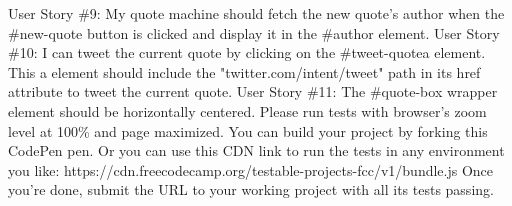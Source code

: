 \documentclass{article}%
\begin{document}
User Story \#9: My quote machine should fetch the new quote's author when the \#new{-}quote button is clicked and display it in the \#author element.\newline%
User Story \#10: I can tweet the current quote by clicking on the \#tweet{-}quotea element. This a element should include the "twitter.com/intent/tweet" path in its href attribute to tweet the current quote.\newline%
User Story \#11: The \#quote{-}box wrapper element should be horizontally centered. Please run tests with browser's zoom level at 100\% and page maximized.\newline%
You can build your project by forking this CodePen pen. Or you can use this CDN link to run the tests in any environment you like: https://cdn.freecodecamp.org/testable{-}projects{-}fcc/v1/bundle.js\newline%
Once you're done, submit the URL to your working project with all its tests passing.\newline%

%
\end{document}
